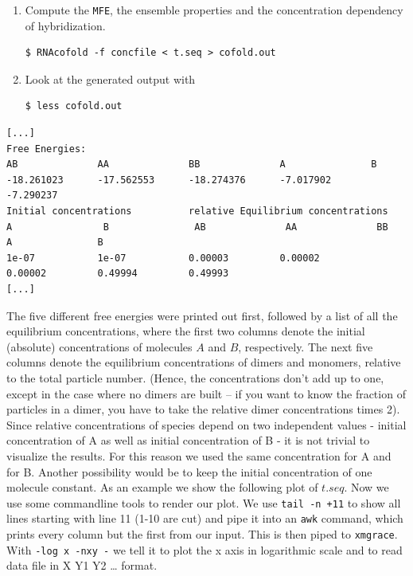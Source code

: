 \documentclass[]{article}
\providecommand{\tightlist}{%
  \setlength{\itemsep}{0pt}\setlength{\parskip}{0pt}}
\begin{document}
\begin{enumerate}
\def\labelenumi{\arabic{enumi}.}
\setcounter{enumi}{1}
\tightlist
\item
  Compute the \texttt{MFE}, the ensemble properties and the
  concentration dependency of hybridization.

\begin{verbatim}
$ RNAcofold -f concfile < t.seq > cofold.out
\end{verbatim}
\item
  Look at the generated output with
\begin{verbatim}
$ less cofold.out
\end{verbatim}
\end{enumerate}

\begin{verbatim}
[...]
Free Energies:
AB              AA              BB              A               B
-18.261023      -17.562553      -18.274376      -7.017902       -7.290237
Initial concentrations          relative Equilibrium concentrations
A                B               AB              AA              BB              A               B
1e-07           1e-07           0.00003         0.00002         0.00002         0.49994         0.49993
[...]
\end{verbatim}

The five different free energies were printed out first, followed by a list
of all the equilibrium concentrations, where the first two columns denote
the initial (absolute) concentrations of molecules \(A\) and \(B\),
respectively. The next five columns denote the equilibrium concentrations
of dimers and monomers, relative to the total particle number. (Hence,
the concentrations don't add up to one, except in the case where no
dimers are built -- if you want to know the fraction of particles in a
dimer, you have to take the relative dimer concentrations times 2).\\
Since relative concentrations of species depend on two independent
values - initial concentration of A as well as initial concentration of
B - it is not trivial to visualize the results. For this reason we used
the same concentration for A and for B. Another possibility would be to
keep the initial concentration of one molecule constant. As an example
we show the following plot of \(t.seq\). Now we use some commandline
tools to render our plot. We use \texttt{tail\ -n\ +11} to show all
lines starting with line 11 (1-10 are cut) and pipe it into an
\texttt{awk} command, which prints every column but the first from our
input. This is then piped to \texttt{xmgrace}. With
\texttt{-log\ x\ -nxy\ -} we tell it to plot the x axis in logarithmic
scale and to read data file in X Y1 Y2 \ldots{} format.
\end{document}
